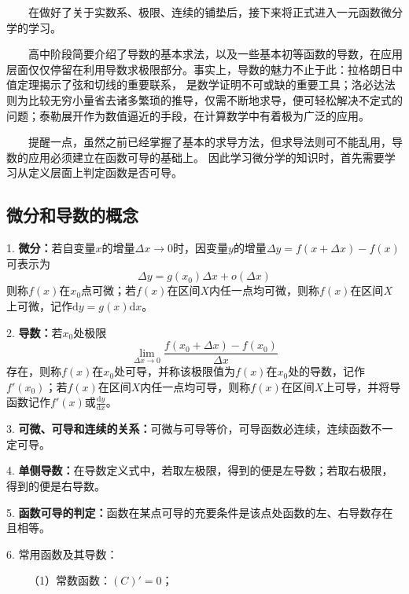 \begin{tcolorbox}[colback=red!5,colframe=red!75!black]
    ~~~~在做好了关于实数系、极限、连续的铺垫后，接下来将正式进入一元函数微分学的学习。

    ~~~~高中阶段简要介绍了导数的基本求法，以及一些基本初等函数的导数，在应用层面仅仅停留在利用导数求极限部分。事实上，导数的魅力不止于此：拉格朗日中值定理揭示了弦和切线的重要联系，
    是数学证明不可或缺的重要工具；洛必达法则为比较无穷小量省去诸多繁琐的推导，仅需不断地求导，便可轻松解决不定式的问题；泰勒展开作为数值逼近的手段，在计算数学中有着极为广泛的应用。    
    
    ~~~~提醒一点，虽然之前已经掌握了基本的求导方法，但求导法则可不能乱用，导数的应用必须建立在函数可导的基础上。
    因此学习微分学的知识时，首先需要学习从定义层面上判定函数是否可导。

\end{tcolorbox}

\subsection{微分和导数的概念}

1. \textbf{微分：}若自变量$x$的增量$\Delta x\rightarrow 0$时，因变量$y$的增量$\Delta y =f(x+\Delta x)-f(x)$可表示为
\begin{equation*}
    \Delta y = g(x_0)\Delta x+o(\Delta x)
\end{equation*}
则称$f(x)$在$x_0$点可微；若$f(x)$在区间$X$内任一点均可微，则称$f(x)$在区间$X$上可微，记作$\mathrm{d}y=g(x)\mathrm{d}x$。

2. \textbf{导数：}若$x_0$处极限
\begin{equation*}
    \lim\limits_{\Delta x \rightarrow 0}\frac{f(x_0+\Delta x)-f(x_0)}{\Delta x}
\end{equation*}
存在，则称$f(x)$在$x_0$处可导，并称该极限值为$f(x)$在$x_0$处的导数，记作$f'(x_0)$；若$f(x)$在区间$X$内任一点均可导，则称$f(x)$在区间$X$上可导，并将导函数记作$f'(x)$或$\frac{\mathrm{d}y}{\mathrm{d}x}$。

3. \textbf{可微、可导和连续的关系：}可微与可导等价，可导函数必连续，连续函数不一定可导。

4. \textbf{单侧导数：}在导数定义式中，若取左极限，得到的便是左导数；若取右极限，得到的便是右导数。

5. \textbf{函数可导的判定：}函数在某点可导的充要条件是该点处函数的左、右导数存在且相等。

6. 常用函数及其导数：

~~~~（1）常数函数：$(C)'=0$；

